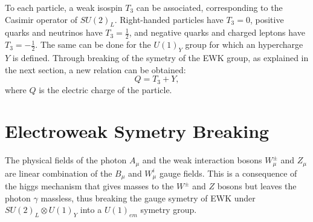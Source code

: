     To each particle, a weak isospin $ T_3 $ can be associated, corresponding to the Casimir operator of $ SU(2)_L $. Right-handed particles have $ T_3 = 0 $, positive quarks and neutrinos have $ T_3 = \frac{1}{2} $, and negative quarks and charged leptons have $ T_3 = - \frac{1}{2} $. The same can be done for the $ U(1)_Y $ group for which an hypercharge $ Y $ is defined. Through breaking of the symetry of the EWK group, as explained in the next section, a new relation can be obtained:
    \begin{equation}
      Q = T_3 + Y ,
    \end{equation}
    where $ Q $ is the electric charge of the particle.

  \section{Electroweak Symetry Breaking}

    The physical fields of the photon $ A_\mu $ and the weak interaction bosons $ W^\pm_\mu $ and $ Z_\mu $ are linear combination of the $ B_\mu $ and $ W^i_\mu $ gauge fields. This is a consequence of the higgs mechanism that gives masses to the $ W^\pm $ and $ Z $ bosons but leaves the photon $ \gamma $ massless, thus breaking the gauge symetry of EWK under $ SU(2)_L \otimes U(1)_Y $ into a $ U(1)_{em} $ symetry group. \\

